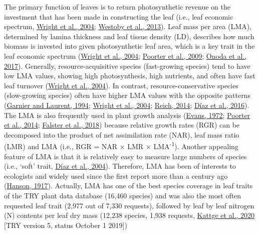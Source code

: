 \documentclass[
  12pt,
  a4paper,
,tablecaptionabove
]{scrartcl}
\begin{document}
The primary function of leaves is to return photosynthetic revenue on the investment that has been made in constructing the leaf (i.e., leaf economic spectrum, \protect\hyperlink{ref-Wright2004a}{Wright et al., 2004}; \protect\hyperlink{ref-Westoby2013}{Westoby et al., 2013}).
Leaf mass per area (LMA), determined by lamina thickness and leaf tissue density (LD), describes how much biomass is invested into given photosynthetic leaf area, which is a key trait in the leaf economic spectrum (\protect\hyperlink{ref-Wright2004a}{Wright et al., 2004}; \protect\hyperlink{ref-Poorter2009}{Poorter et al., 2009}; \protect\hyperlink{ref-Onoda2017}{Onoda et al., 2017}).
Generally, resource-acquisitive species (fast-growing species) tend to have low LMA values, showing high photosynthesis, high nutrients, and often have fast leaf turnover (\protect\hyperlink{ref-Wright2004a}{Wright et al., 2004}).
In contrast, resource-conservative species (slow-growing species) often have higher LMA values with the opposite patterns (\protect\hyperlink{ref-Garnier1994}{Garnier and Laurent, 1994}; \protect\hyperlink{ref-Wright2004a}{Wright et al., 2004}; \protect\hyperlink{ref-Reich2014}{Reich, 2014}; \protect\hyperlink{ref-Diaz2016}{Díaz et al., 2016}).
The LMA is also frequently used in plant growth analysis (\protect\hyperlink{ref-Evans1972}{Evans, 1972}; \protect\hyperlink{ref-Poorter2014}{Poorter et al., 2014}; \protect\hyperlink{ref-Falster2018}{Falster et al., 2018}) because relative growth rates (RGR) can be decomposed into the product of net assimilation rate (NAR), leaf mass ratio (LMR) and LMA (i.e., RGR = NAR \(\times\) LMR \(\times\) LMA\textsuperscript{-1}).
Another appealing feature of LMA is that it is relatively easy to measure large numbers of species (i.e., `soft' trait, \protect\hyperlink{ref-Diaz2004}{Díaz et al., 2004}).
Therefore, LMA has been of interests to ecologists and widely used since the first report more than a century ago (\protect\hyperlink{ref-Hanson1917}{Hanson, 1917}).
Actually, LMA has one of the best species coverage in leaf traits of the TRY plant data database (16,460 species) and was also the most often requested leaf trait (2,977 out of 7,330 requests), followed by leaf by leaf nitrogen (N) contents per leaf dry mass (12,238 species, 1,938 requests, \protect\hyperlink{ref-Kattge2020}{Kattge et al., 2020} {[}TRY version 5, status October 1 2019{]})
\end{document}
